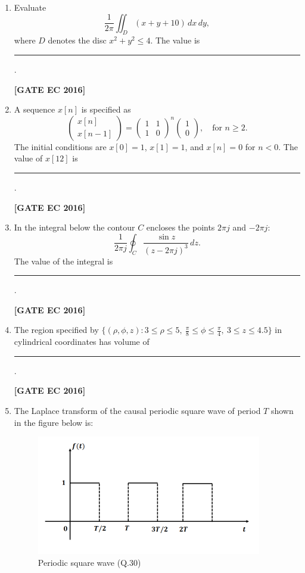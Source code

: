 \documentclass[12pt]{article}
\begin{document}
\begin{enumerate}[label=\textbf{Q.\arabic*.}, start=6, itemsep=2em]
\begin{enumerate}[label=\textbf{Q.\arabic*.}, start=26]
\item Evaluate
\[
\frac{1}{2\pi}\iint_{D} (x+y+10)\,dx\,dy,
\]
where \(D\) denotes the disc \(x^2+y^2\le 4\). The value is \rule{3cm}{0.4pt}.

\noindent \textbf{[GATE EC 2016]}

\item A sequence $x[n]$ is specified as
\[
\begin{pmatrix} x[n] \\ x[n-1] \end{pmatrix}
=
\begin{pmatrix} 1 & 1 \\[3pt] 1 & 0 \end{pmatrix}^n
\begin{pmatrix} 1 \\[3pt] 0 \end{pmatrix}, \quad \text{for } n\ge 2.
\]
The initial conditions are $x[0]=1$, $x[1]=1$, and $x[n]=0$ for $n<0$. The value of $x[12]$ is \rule{3cm}{0.4pt}.

\noindent \textbf{[GATE EC 2016]}

\item In the integral below the contour $C$ encloses the points $2\pi j$ and $-2\pi j$:
\[
\frac{1}{2\pi j}\oint_{C}\frac{\sin z}{(z-2\pi j)^3}\,dz.
\]
The value of the integral is \rule{3cm}{0.4pt}.

\noindent \textbf{[GATE EC 2016]}

\item The region specified by \(\{(\rho,\phi,z): 3\le \rho\le 5,\ \tfrac{\pi}{8}\le\phi\le\tfrac{\pi}{4},\ 3\le z\le 4.5\}\) in cylindrical coordinates has volume of \rule{3cm}{0.4pt}.

\noindent \textbf{[GATE EC 2016]}

\item The Laplace transform of the causal periodic square wave of period $T$ shown in the figure below is:

\begin{figure}[H]\centering
    \includegraphics[width=0.6\columnwidth]{figs/q30.png}
    \caption{Periodic square wave (Q.30)}
    \label{fig:q30}
\end{figure}


\end{enumerate}
\end{enumerate}
\end{document}
